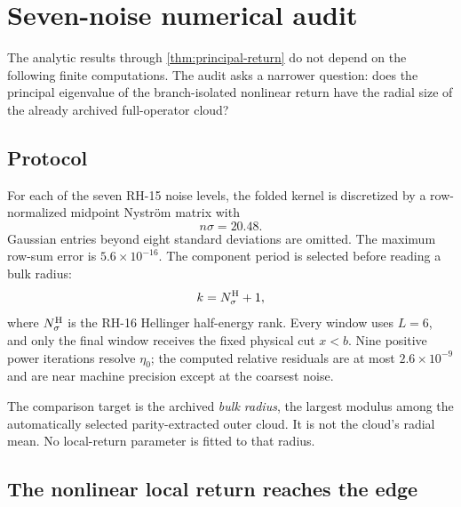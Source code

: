 \documentclass[11pt]{article}
\theoremstyle{definition}
\theoremstyle{remark}
\begin{document}
\section{Seven-noise numerical audit}
\label{sec:numerics}

The analytic results through \cref{thm:principal-return} do not depend on
the following finite computations.  The audit asks a narrower question:
does the principal eigenvalue of the branch-isolated nonlinear return have
the radial size of the already archived full-operator cloud?

\subsection{Protocol}

For each of the seven RH-15 noise levels, the folded kernel is discretized by
a row-normalized midpoint Nystr\"om matrix with
\begin{equation}\label{eq:grid-scaling}
 n\sigma=20.48.
\end{equation}
Gaussian entries beyond eight standard deviations are omitted.  The maximum
row-sum error is $5.6\times10^{-16}$.  The component period is selected before
reading a bulk radius:
\begin{equation}\label{eq:period-selection}
 k=N_\sigma^{\rm H}+1,
\end{equation}
where $N_\sigma^{\rm H}$ is the RH-16 Hellinger half-energy rank.  Every
window uses $L=6$, and only the final window receives the fixed physical cut
$x<b$.  Nine positive power iterations resolve $\eta_0$; the computed
relative residuals are at most $2.6\times10^{-9}$ and are near machine
precision except at the coarsest noise.

The comparison target is the archived \emph{bulk radius}, the largest
modulus among the automatically selected parity-extracted outer cloud.  It
is not the cloud's radial mean.  No local-return parameter is fitted to that
radius.

\subsection{The nonlinear local return reaches the edge}
\end{document}
